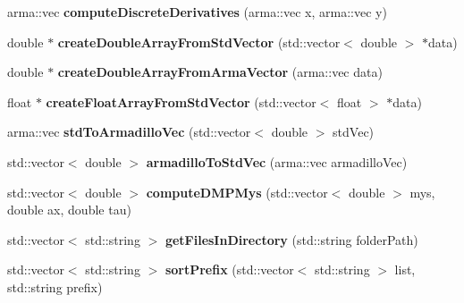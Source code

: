 \begin{DoxyCompactItemize}
\item 
\hypertarget{namespacekukadu_a624f93fab797148406ed6fc8fb3b27aa}{arma\-::vec {\bfseries compute\-Discrete\-Derivatives} (arma\-::vec x, arma\-::vec y)}\label{namespacekukadu_a624f93fab797148406ed6fc8fb3b27aa}

\item 
\hypertarget{namespacekukadu_a2508a08633bd3cfe5443abeedc7b3736}{double $\ast$ {\bfseries create\-Double\-Array\-From\-Std\-Vector} (std\-::vector$<$ double $>$ $\ast$data)}\label{namespacekukadu_a2508a08633bd3cfe5443abeedc7b3736}

\item 
\hypertarget{namespacekukadu_adb8d490dd8c2cccd6d17aeefbc678b58}{double $\ast$ {\bfseries create\-Double\-Array\-From\-Arma\-Vector} (arma\-::vec data)}\label{namespacekukadu_adb8d490dd8c2cccd6d17aeefbc678b58}

\item 
\hypertarget{namespacekukadu_a8e1c0f80941da1d7aa88815fc93d7c7e}{float $\ast$ {\bfseries create\-Float\-Array\-From\-Std\-Vector} (std\-::vector$<$ float $>$ $\ast$data)}\label{namespacekukadu_a8e1c0f80941da1d7aa88815fc93d7c7e}

\item 
\hypertarget{namespacekukadu_a62ccc34ae961950c370f6b4eb79eb43d}{arma\-::vec {\bfseries std\-To\-Armadillo\-Vec} (std\-::vector$<$ double $>$ std\-Vec)}\label{namespacekukadu_a62ccc34ae961950c370f6b4eb79eb43d}

\item 
\hypertarget{namespacekukadu_a045fd840a5811c4c12be38c5d44bdfaf}{std\-::vector$<$ double $>$ {\bfseries armadillo\-To\-Std\-Vec} (arma\-::vec armadillo\-Vec)}\label{namespacekukadu_a045fd840a5811c4c12be38c5d44bdfaf}

\item 
\hypertarget{namespacekukadu_a9d1317f4e5dcf564f7409eb6fc50af96}{std\-::vector$<$ double $>$ {\bfseries compute\-D\-M\-P\-Mys} (std\-::vector$<$ double $>$ mys, double ax, double tau)}\label{namespacekukadu_a9d1317f4e5dcf564f7409eb6fc50af96}

\item 
\hypertarget{namespacekukadu_a697f64d963479c2d3ba5c2a2a0cd510f}{std\-::vector$<$ std\-::string $>$ {\bfseries get\-Files\-In\-Directory} (std\-::string folder\-Path)}\label{namespacekukadu_a697f64d963479c2d3ba5c2a2a0cd510f}

\item 
\hypertarget{namespacekukadu_a6240d6b07b740be2461ce1e8b93b5f33}{std\-::vector$<$ std\-::string $>$ {\bfseries sort\-Prefix} (std\-::vector$<$ std\-::string $>$ list, std\-::string prefix)}\label{namespacekukadu_a6240d6b07b740be2461ce1e8b93b5f33}


\end{DoxyCompactItemize}
